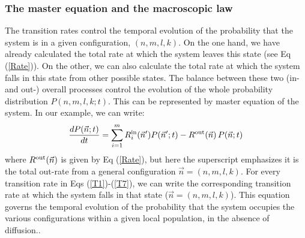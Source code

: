 \subsubsection*{The master equation and the macroscopic law}
The transition rates control the temporal evolution of the probability that the system is in a given configuration, $(n,m,l,k)$. On the one hand, we have already calculated the total rate at which the system leaves this state (see Eq (\ref{Rate})). On the other, we can also calculate the total rate at which the system falls in this state from other possible states. The balance between these two (in- and out-) overall processes control the evolution of the whole probability distribution $P(n,m,l,k; t)$. This can be represented by master equation of the system. In our example, we can write: 
\begin{equation}
	\frac{dP(\vec{n}; t)}{dt} = \sum_{i=1}^m R^{\textup{in}}_i(\vec{n}')P(\vec{n}';t) - R^{\textup{out}}(\vec{n})\,P(\vec{n}; t)
	\label{eq:ME}
\end{equation} 
where $R^{\textup{out}}(\vec{n})$ is given by Eq (\ref{Rate}), but here the superscript  emphasizes it is the total out-rate from a general configuration $\vec{n}=(n,m,l,k)$. For every  transition rate in Eqs (\ref{T1})-(\ref{T7}), we can write the corresponding transition rate at which the system falls in that state ($\vec{n}=(n,m,l,k)$). This equation governs the temporal evolution of the probability that the system occupies the various configurations within a given local population, in the absence of diffusion..

